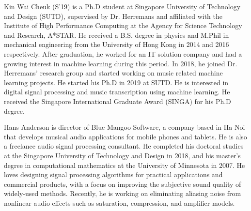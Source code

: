 \documentclass{ieeeaccess}
\begin{document}
\vfill\pagebreak



\vfill\pagebreak

\begin{IEEEbiography}{Kin Wai Cheuk} (S'19) is a Ph.D student at Singapore University of Technology and Design (SUTD), supervised by Dr. Herremans and affiliated with the Institute of High Performance Computing at the Agency for Science Technology and Research, A*STAR. He received a B.S. degree in physics and M.Phil in mechanical engineering from the University of Hong Kong in 2014 and 2016 respectively. After graduation, he worked for an IT solution company and had a growing interest in machine learning during this period. In 2018, he joined Dr. Herremans' research group and started working on music related machine learning projects. He started his Ph.D in 2019 at SUTD. He is interested in digital signal processing and music transcription using machine learning. He received the Singapore International Graduate Award (SINGA) for his Ph.D degree.
\end{IEEEbiography}

\begin{IEEEbiography}{Hans Anderson} is director of Blue Mangoo Software, a company based in Ha Noi that develops musical audio applications for mobile phones and tablets. He is also a freelance audio signal processing consultant. He completed his doctoral studies at the Singapore University of Technology and Design in 2018, and his master's degree in computational mathematics at the University of Minnesota in 2007. He loves designing signal processing algorithms for practical applications and commercial products, with a focus on improving the subjective sound quality of widely-used methods. Recently, he is working on eliminating aliasing noise from nonlinear audio effects such as saturation, compression, and amplifier models.
\end{IEEEbiography}
\end{document}
